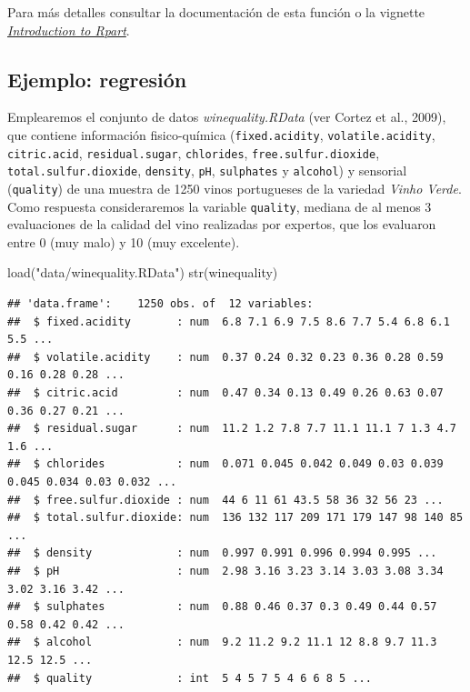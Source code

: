 \documentclass[
]{book}
\newenvironment{Shaded}{\begin{snugshade}}{\end{snugshade}}
\newcommand{\FunctionTok}[1]{\textcolor[rgb]{0.00,0.00,0.00}{#1}}
\newcommand{\NormalTok}[1]{#1}
\newcommand{\StringTok}[1]{\textcolor[rgb]{0.31,0.60,0.02}{#1}}
\theoremstyle{break}
\theoremstyle{definition}
\theoremstyle{definition}
\theoremstyle{definition}
\theoremstyle{definition}
\theoremstyle{remark}
\begin{document}
Para más detalles consultar la documentación de esta función o la vignette \href{https://cran.r-project.org/web/packages/rpart/vignettes/longintro.pdf}{\emph{Introduction to Rpart}}.

\hypertarget{ejemplo-regresiuxf3n}{%
\subsection{Ejemplo: regresión}\label{ejemplo-regresiuxf3n}}

Emplearemos el conjunto de datos \emph{winequality.RData} (ver Cortez et al., 2009), que contiene información fisico-química
(\texttt{fixed.acidity}, \texttt{volatile.acidity}, \texttt{citric.acid}, \texttt{residual.sugar}, \texttt{chlorides}, \texttt{free.sulfur.dioxide},
\texttt{total.sulfur.dioxide}, \texttt{density}, \texttt{pH}, \texttt{sulphates} y \texttt{alcohol}) y sensorial (\texttt{quality})
de una muestra de 1250 vinos portugueses de la variedad \emph{Vinho Verde}.
Como respuesta consideraremos la variable \texttt{quality}, mediana de al menos 3 evaluaciones de la calidad del vino
realizadas por expertos, que los evaluaron entre 0 (muy malo) y 10 (muy excelente).

\begin{Shaded}
\begin{Highlighting}[]
\FunctionTok{load}\NormalTok{(}\StringTok{"data/winequality.RData"}\NormalTok{)}
\FunctionTok{str}\NormalTok{(winequality)}
\end{Highlighting}
\end{Shaded}

\begin{verbatim}
## 'data.frame':    1250 obs. of  12 variables:
##  $ fixed.acidity       : num  6.8 7.1 6.9 7.5 8.6 7.7 5.4 6.8 6.1 5.5 ...
##  $ volatile.acidity    : num  0.37 0.24 0.32 0.23 0.36 0.28 0.59 0.16 0.28 0.28 ...
##  $ citric.acid         : num  0.47 0.34 0.13 0.49 0.26 0.63 0.07 0.36 0.27 0.21 ...
##  $ residual.sugar      : num  11.2 1.2 7.8 7.7 11.1 11.1 7 1.3 4.7 1.6 ...
##  $ chlorides           : num  0.071 0.045 0.042 0.049 0.03 0.039 0.045 0.034 0.03 0.032 ...
##  $ free.sulfur.dioxide : num  44 6 11 61 43.5 58 36 32 56 23 ...
##  $ total.sulfur.dioxide: num  136 132 117 209 171 179 147 98 140 85 ...
##  $ density             : num  0.997 0.991 0.996 0.994 0.995 ...
##  $ pH                  : num  2.98 3.16 3.23 3.14 3.03 3.08 3.34 3.02 3.16 3.42 ...
##  $ sulphates           : num  0.88 0.46 0.37 0.3 0.49 0.44 0.57 0.58 0.42 0.42 ...
##  $ alcohol             : num  9.2 11.2 9.2 11.1 12 8.8 9.7 11.3 12.5 12.5 ...
##  $ quality             : int  5 4 5 7 5 4 6 6 8 5 ...
\end{verbatim}
\end{document}
